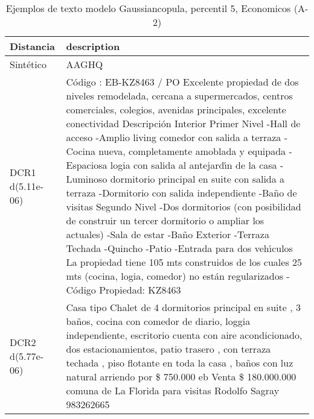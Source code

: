 \begin{table}[H]
\centering
\fontsize{10}{14}\selectfont
\caption{Ejemplos de texto modelo Gaussiancopula, percentil 5, Economicos (A-2)}
\label{table-example-economicos-a-2-gaussiancopula-5p-text}
\begin{tabular}{|l|m{35em}|}
\hline
\rowcolor[gray]{0.8}
Distancia & description \\
\hline Sintético & AAGHQ \\
\hline DCR1 d(5.11e-06) & C\'odigo : EB-KZ8463 / PO  Excelente propiedad de dos niveles remodelada, cercana a supermercados, centros comerciales, colegios, avenidas principales, excelente conectividad  Descripci\'on Interior Primer Nivel -Hall de acceso -Amplio living comedor con salida a terraza -Cocina nueva, completamente amoblada y equipada -Espaciosa logia con salida al antejard{\'\i}n de la casa -Luminoso dormitorio principal en suite con salida a terraza -Dormitorio con salida independiente -Ba\~no de visitas  Segundo Nivel -Dos dormitorios (con posibilidad de construir un tercer dormitorio o ampliar los actuales) -Sala de estar -Ba\~no  Exterior -Terraza Techada -Quincho -Patio -Entrada para dos veh{\'\i}culos  La propiedad tiene 105 mts construidos de los cuales 25 mts (cocina, logia, comedor) no est\'an regularizados - C\'odigo Propiedad: KZ8463 \\
\hline DCR2 d(5.77e-06) & Casa tipo Chalet de 4 dormitorios principal en suite , 3 ba\~nos, cocina con comedor de diario, loggia independiente, escritorio cuenta con aire acondicionado, dos estacionamientos, patio trasero , con terraza techada , piso flotante en toda la casa , ba\~nos con luz natural arriendo por \$ 750.000 eb Venta \$ 180.000.000 comuna de La Florida para visitas Rodolfo Sagray 983262665 \\
\hline
\end{tabular}
\end{table}
